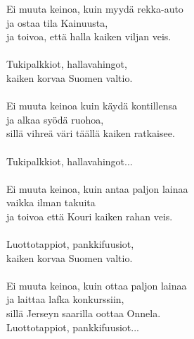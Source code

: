
Ei muuta keinoa, kuin myydä rekka-auto \\ ja ostaa tila Kainuusta, \\ ja toivoa, että halla kaiken viljan veis. \\ \hspace{10mm} \\ Tukipalkkiot, hallavahingot, \\ kaiken korvaa Suomen valtio. \\ \hspace{10mm} \\ Ei muuta keinoa kuin käydä kontillensa \\ ja alkaa syödä ruohoa, \\ sillä vihreä väri täällä kaiken ratkaisee. \\ \hspace{10mm} \\ Tukipalkkiot, hallavahingot... \\ \hspace{10mm} \\ Ei muuta keinoa, kuin antaa paljon lainaa \\ vaikka ilman takuita \\ ja toivoa että Kouri kaiken rahan veis. \\ \hspace{10mm} \\ Luottotappiot, pankkifuusiot, \\ kaiken korvaa Suomen valtio. \\ \hspace{10mm} \\ Ei muuta keinoa, kuin ottaa paljon lainaa \\ ja laittaa lafka konkurssiin, \\ sillä Jerseyn saarilla oottaa Onnela. \\ Luottotappiot, pankkifuusiot...